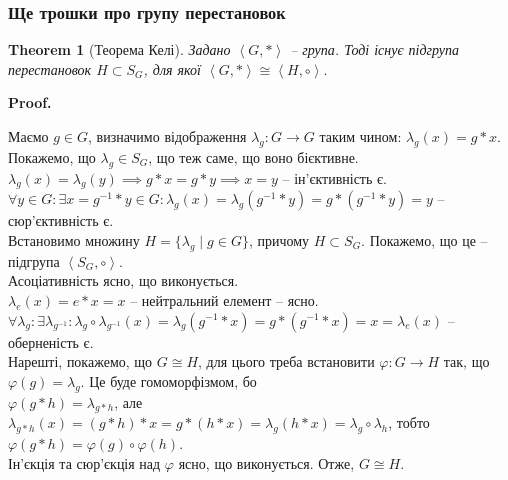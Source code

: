 \documentclass[a4paper, 10pt]{article}
\makeatletter
\theoremstyle{theoremdd}
\newtheorem{theorem}{Theorem}[subsection]
\theoremstyle{theoremdd}
\theoremstyle{theoremdd}
\theoremstyle{theoremdd}
\theoremstyle{theoremdd}
\theoremstyle{theoremdd}
\theoremstyle{theoremdd}
\theoremstyle{theoremdd}
\theoremstyle{theoremdd}
\theoremstyle{theoremdd}
\theoremstyle{theoremdd}
\theoremstyle{theoremdd}
\theoremstyle{theoremdd}
\theoremstyle{theoremdd}
\newtheorem{corollary}[theorem]{Corollary}
\theoremstyle{theoremdd}
\renewenvironment{proof}[1][Proof.\\]{\par
\pushQED{\hfill \qed}%
\normalfont \topsep6\p@\@plus6\p@\relax
\trivlist
\item\relax
{\bfseries
#1\@addpunct{.}}\hspace\labelsep\ignorespaces
}{%
\popQED\endtrivlist\@endpefalse
}
\DeclareMathOperator{\ord}{ord}
\makeatother
\begin{document}
\subsubsection*{Ще трошки про групу перестановок}

\begin{theorem}[Теорема Келі]
Задано $\left< G,*\right>$ -- група. Тоді існує підгрупа перестановок $H \subset S_G$, для якої $\left< G, *\right> \cong \left< H, \circ \right>$.
\end{theorem}

\begin{proof}
Маємо $g \in G$, визначимо відображення $\lambda_g \colon G \to G$ таким чином: $\lambda_g(x) = g*x$. Покажемо, що $\lambda_g \in S_G$, що теж саме, що воно бієктивне.\\
$\lambda_g(x) = \lambda_g(y) \implies g*x = g*y \implies x = y$ -- ін'єктивність є.\\
$\forall y \in G: \exists x = g^{-1}*y \in G: \lambda_g(x) = \lambda_g(g^{-1}*y) = g*(g^{-1}*y) = y$ -- сюр'єктивність є.
\bigskip \\
Встановимо множину $H = \{ \lambda_g \mid g \in G\}$, причому $H \subset S_G$. Покажемо, що це -- підгрупа $\left< S_G, \circ \right>$.\\
Асоціативність ясно, що виконується.\\
$\lambda_e(x) = e*x = x$ -- нейтральний елемент -- ясно.\\
$\forall \lambda_g: \exists \lambda_{g^{-1}}: \lambda_g \circ \lambda_{g^{-1}} (x) = \lambda_g(g^{-1}*x) = g*(g^{-1}*x) = x = \lambda_e(x)$ -- оберненість є.
\bigskip \\
Нарешті, покажемо, що $G \cong H$, для цього треба встановити $\varphi \colon G \to H$ так, що $\varphi(g) = \lambda_g$. Це буде гомоморфізмом, бо\\
$\varphi(g*h) = \lambda_{g*h}$, але $\lambda_{g*h}(x) = (g*h)*x = g*(h*x) = \lambda_g(h*x) = \lambda_g \circ \lambda_h$, тобто $\varphi(g*h) = \varphi(g) \circ \varphi(h)$.\\
Ін'єкція та сюр'єкція над $\varphi$ ясно, що виконується. Отже, $G \cong H$.
\end{proof}

\iffalse
\begin{corollary}
Задано $\left< G, * \right>$ -- група з $\ord G = n$. Тоді $\left< G,*\right> \cong \left< S_n, \circ \right>$.
\end{corollary}
\fi
\end{document}
